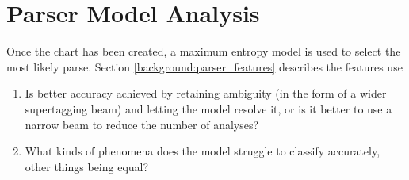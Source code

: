 \section{Parser Model Analysis}

Once the chart has been created, a maximum entropy model is used to select the most likely parse. Section \ref{background:parser_features} describes the features \citet{candc} use

\begin{enumerate}
 \item Is better accuracy achieved by retaining ambiguity (in the form of a wider supertagging beam) and letting the model resolve it, or is it better to use a narrow beam to reduce the number of analyses?
 \item What kinds of phenomena does the model struggle to classify accurately, other things being equal?
\end{enumerate}




